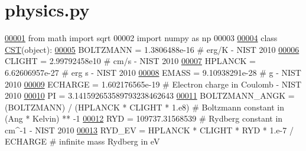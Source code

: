 \hypertarget{physics_8py_source}{}\section{physics.\+py}
\label{physics_8py_source}

\begin{DoxyCode}
\hypertarget{physics_8py_source_l00001}{}\hyperlink{namespacepyneb_1_1utils_1_1physics}{00001} \textcolor{keyword}{from} math \textcolor{keyword}{import} sqrt
00002 \textcolor{keyword}{import} numpy \textcolor{keyword}{as} np
00003 
\hypertarget{physics_8py_source_l00004}{}\hyperlink{classpyneb_1_1utils_1_1physics_1_1_c_s_t}{00004} \textcolor{keyword}{class }\hyperlink{classpyneb_1_1utils_1_1physics_1_1_c_s_t}{CST}(object):
\hypertarget{physics_8py_source_l00005}{}\hyperlink{classpyneb_1_1utils_1_1physics_1_1_c_s_t_aee0d21a1f9edd72e75c5369bd5bc36b9}{00005}     BOLTZMANN = 1.3806488e-16 \textcolor{comment}{# erg/K - NIST 2010}
\hypertarget{physics_8py_source_l00006}{}\hyperlink{classpyneb_1_1utils_1_1physics_1_1_c_s_t_a316a5d8a7c983441bd40589f040f3a09}{00006}     CLIGHT = 2.99792458e10 \textcolor{comment}{# cm/s - NIST 2010}
\hypertarget{physics_8py_source_l00007}{}\hyperlink{classpyneb_1_1utils_1_1physics_1_1_c_s_t_a00251eede3f56eadeb766c97f3144c55}{00007}     HPLANCK = 6.62606957e-27 \textcolor{comment}{# erg s - NIST 2010}
\hypertarget{physics_8py_source_l00008}{}\hyperlink{classpyneb_1_1utils_1_1physics_1_1_c_s_t_a0131d55ea22f1ecb699a8d5dcf18e62e}{00008}     EMASS = 9.10938291e-28 \textcolor{comment}{# g - NIST 2010}
\hypertarget{physics_8py_source_l00009}{}\hyperlink{classpyneb_1_1utils_1_1physics_1_1_c_s_t_affe8f9c45db60b472fb1779b6e88c43b}{00009}     ECHARGE = 1.602176565e-19 \textcolor{comment}{# Electron charge in Coulomb - NIST 2010}
\hypertarget{physics_8py_source_l00010}{}\hyperlink{classpyneb_1_1utils_1_1physics_1_1_c_s_t_adeb7151ce462944ff7a0ff2803f873c3}{00010}     PI = 3.141592653589793238462643
\hypertarget{physics_8py_source_l00011}{}\hyperlink{classpyneb_1_1utils_1_1physics_1_1_c_s_t_a7c0a4476149f179955c86bfdb63ade78}{00011}     BOLTZMANN\_ANGK = (BOLTZMANN) / (HPLANCK * CLIGHT * 1.e8) \textcolor{comment}{# Boltzmann constant in (Ang * Kelvin) ** -1}
\hypertarget{physics_8py_source_l00012}{}\hyperlink{classpyneb_1_1utils_1_1physics_1_1_c_s_t_a468e4f9fac1fbd71b5ca458a84ae05cc}{00012}     RYD = 109737.31568539 \textcolor{comment}{# Rydberg constant in cm^-1 - NIST 2010 }
\hypertarget{physics_8py_source_l00013}{}\hyperlink{classpyneb_1_1utils_1_1physics_1_1_c_s_t_a337f87b4676ea337149e177d81b481e1}{00013}     RYD\_EV = HPLANCK * CLIGHT * RYD * 1.e-7 / ECHARGE \textcolor{comment}{# infinite mass Rydberg in eV}

\end{DoxyCode}
